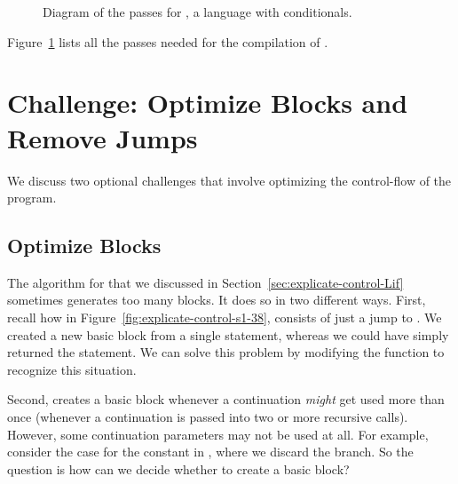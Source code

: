 \documentclass[7x10,nocrop]{TimesAPriori_MIT}%
\begin{document}
\begin{figure}[tbp]
{
\fi}
\caption{Diagram of the passes for \LangIf{}, a language with conditionals.}
 \label{fig:Lif-passes}
\end{figure}

Figure~\ref{fig:Lif-passes} lists all the passes needed for the
compilation of \LangIf{}.


\section{Challenge: Optimize Blocks and Remove Jumps}
\label{sec:opt-jumps}

We discuss two optional challenges that involve optimizing the
control-flow of the program.

\subsection{Optimize Blocks}

The algorithm for  that we discussed in
Section~\ref{sec:explicate-control-Lif} sometimes generates too many
blocks. It does so in two different ways.
%
First, recall how in Figure~\ref{fig:explicate-control-s1-38},
 consists of just a jump to . We created
a new basic block from a single  statement, whereas we
could have simply returned the  statement. We can solve
this problem by modifying the  function to
recognize this situation.

Second,  creates a basic block whenever a
continuation \emph{might} get used more than once (whenever a
continuation is passed into two or more recursive calls). However,
some continuation parameters may not be used at all. For example, consider the
case for the constant \TRUE{} in , where we
discard the  branch.  So the question is how can we decide
whether to create a basic block?
\end{document}

